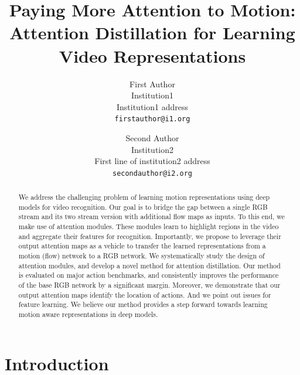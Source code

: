 \documentclass[10pt,twocolumn,letterpaper]{article}
\begin{document}
\title{Paying More Attention to Motion: \\ Attention Distillation for Learning Video Representations}

\author{First Author\\
Institution1\\
Institution1 address\\
{\tt\small firstauthor@i1.org}
\and
Second Author\\
Institution2\\
First line of institution2 address\\
{\tt\small secondauthor@i2.org}
}

\maketitle

\begin{abstract}
We address the challenging problem of learning motion representations using deep models for video recognition. Our goal is to bridge the gap between a single RGB stream and its two stream version with additional flow maps as inputs. To this end, we make use of attention modules. These modules learn to highlight regions in the video and aggregate their features for recognition. Importantly, we propose to leverage their output attention maps as a vehicle to transfer the learned representations from a motion (flow) network to a RGB network. We systematically study the design of attention modules, and develop a novel method for attention distillation. Our method is evaluated on major action benchmarks, and consistently improves the performance of the base RGB network by a significant margin. Moreover, we demonstrate that our output attention maps identify the location of actions. And we point out issues for feature learning. We believe our method provides a step forward towards learning motion aware representations in deep models.
\end{abstract}

\section{Introduction}
\end{document}
